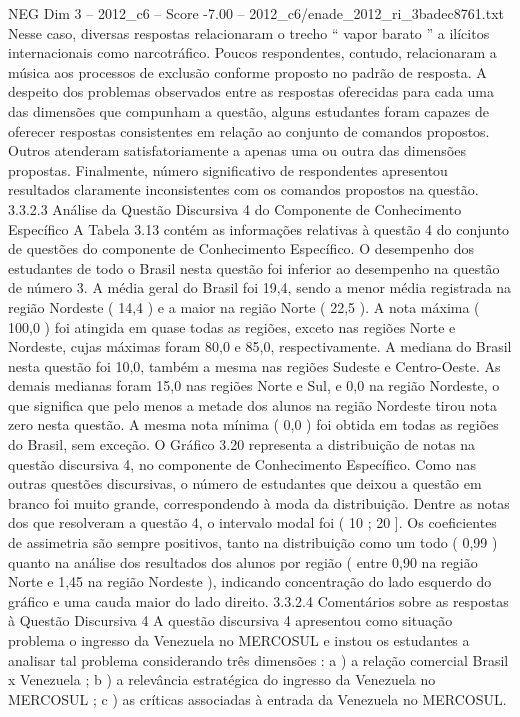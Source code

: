 \begin{textsample}{NEG Dim 3 – 2012\_c6 – Score -7.00 – 2012\_c6/enade\_2012\_ri\_3badec8761.txt}
Nesse caso, diversas respostas relacionaram o trecho “ vapor barato ” a ilícitos internacionais como narcotráfico.
Poucos respondentes, contudo, relacionaram a música aos processos de exclusão conforme proposto no padrão de resposta.
A despeito dos problemas observados entre as respostas oferecidas para cada uma das dimensões que compunham a questão, alguns estudantes foram capazes de oferecer respostas consistentes em relação ao conjunto de comandos propostos.
Outros atenderam satisfatoriamente a apenas uma ou outra das dimensões propostas.
Finalmente, número significativo de respondentes apresentou resultados claramente inconsistentes com os comandos propostos na questão. 3.3.2.3 Análise da Questão Discursiva 4 do Componente de Conhecimento Específico A Tabela 3.13 contém as informações relativas à questão 4 do conjunto de questões do componente de Conhecimento Específico.
O desempenho dos estudantes de todo o Brasil nesta questão foi inferior ao desempenho na questão de número 3.
A média geral do Brasil foi 19,4, sendo a menor média registrada na região Nordeste ( 14,4 ) e a maior na região Norte ( 22,5 ).
A nota máxima ( 100,0 ) foi atingida em quase todas as regiões, exceto nas regiões Norte e Nordeste, cujas máximas foram 80,0 e 85,0, respectivamente.
A mediana do Brasil nesta questão foi 10,0, também a mesma nas regiões Sudeste e Centro-Oeste.
As demais medianas foram 15,0 nas regiões Norte e Sul, e 0,0 na região Nordeste, o que significa que pelo menos a metade dos alunos na região Nordeste tirou nota zero nesta questão.
A mesma nota mínima ( 0,0 ) foi obtida em todas as regiões do Brasil, sem exceção.
O Gráfico 3.20 representa a distribuição de notas na questão discursiva 4, no componente de Conhecimento Específico.
Como nas outras questões discursivas, o número de estudantes que deixou a questão em branco foi muito grande, correspondendo à moda da distribuição.
Dentre as notas dos que resolveram a questão 4, o intervalo modal foi ( 10 ; 20 ].
Os coeficientes de assimetria são sempre positivos, tanto na distribuição como um todo ( 0,99 ) quanto na análise dos resultados dos alunos por região ( entre 0,90 na região Norte e 1,45 na região Nordeste ), indicando concentração do lado esquerdo do gráfico e uma cauda maior do lado direito. 3.3.2.4 Comentários sobre as respostas à Questão Discursiva 4 A questão discursiva 4 apresentou como situação problema o ingresso da Venezuela no MERCOSUL e instou os estudantes a analisar tal problema considerando três dimensões : a ) a relação comercial Brasil x Venezuela ; b ) a relevância estratégica do ingresso da Venezuela no MERCOSUL ; c ) as críticas associadas à entrada da Venezuela no MERCOSUL.

\end{textsample}
